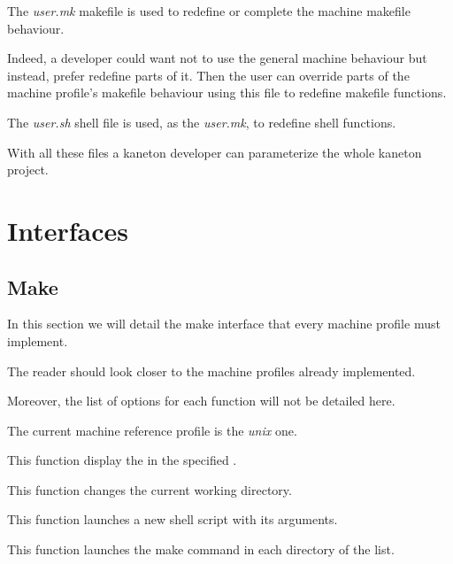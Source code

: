 The \textit{user.mk} makefile is used to redefine or complete the machine
makefile behaviour.

Indeed, a developer could want not to use the general machine behaviour but
instead, prefer redefine parts of it. Then the user can override parts of
the machine profile's makefile behaviour using this file to redefine makefile
functions.

The \textit{user.sh} shell file is used, as the \textit{user.mk}, to
redefine shell functions.

With all these files a kaneton developer can parameterize the whole
kaneton project.

%
%

\section{Interfaces}

%
%

\subsection{Make}

In this section we will detail the make interface that every machine
profile must implement.

The reader should look closer to the machine profiles already implemented.

Moreover, the list of options for each function will not be detailed here.

The current machine reference profile is the \textit{unix} one.

         {This function display the  in the specified
	   .}

         {This function changes the current working directory.}

         {This function launches a new shell script with its arguments.}

         {This function launches the make command in each directory of
	   the list.}

